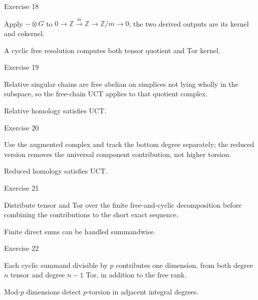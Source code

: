 \begin{exercise}\label{exr:viii26-18}
Exercise 18
\end{exercise}
\begin{hint}
Apply \(-\otimes G\) to \(0\to\mathbb Z\xrightarrow{m}\mathbb Z\to\mathbb Z/m\to0\); the two derived outputs are its kernel and cokernel.
\end{hint}
\begin{solution}
A cyclic free resolution computes both tensor quotient and Tor kernel.
\end{solution}

\begin{exercise}\label{exr:viii26-19}
Exercise 19
\end{exercise}
\begin{hint}
Relative singular chains are free abelian on simplices not lying wholly in the subspace, so the free-chain UCT applies to that quotient complex.
\end{hint}
\begin{solution}
Relative homology satisfies UCT.
\end{solution}

\begin{exercise}\label{exr:viii26-20}
Exercise 20
\end{exercise}
\begin{hint}
Use the augmented complex and track the bottom degree separately; the reduced version removes the universal component contribution, not higher torsion.
\end{hint}
\begin{solution}
Reduced homology satisfies UCT.
\end{solution}

\begin{exercise}\label{exr:viii26-21}
Exercise 21
\end{exercise}
\begin{hint}
Distribute tensor and Tor over the finite free-and-cyclic decomposition before combining the contributions to the short exact sequence.
\end{hint}
\begin{solution}
Finite direct sums can be handled summandwise.
\end{solution}

\begin{exercise}\label{exr:viii26-22}
Exercise 22
\end{exercise}
\begin{hint}
Each cyclic summand divisible by \(p\) contributes one dimension, from both degree \(n\) tensor and degree \(n-1\) Tor, in addition to the free rank.
\end{hint}
\begin{solution}
Mod-\(p\) dimensions detect \(p\)-torsion in adjacent integral degrees.
\end{solution}

